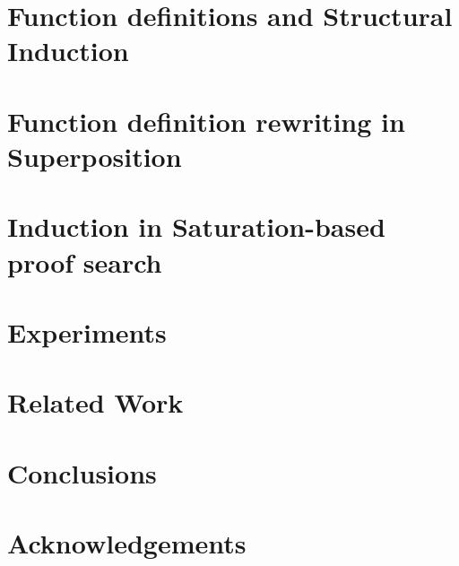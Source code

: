\documentclass[runningheads]{llncs}
\begin{document}
\section{Function definitions and Structural Induction}
\label{sec:fn_defs}


\section{Function definition rewriting in Superposition}
\label{sec:fn_def_rewriting}


\section{Induction in Saturation-based proof search}
\label{sec:saturation}


\section{Experiments}
\label{sec:experiments}


\section{Related Work}


\section{Conclusions}

\section*{Acknowledgements}

%
%
%
% 
% 
%



 
\end{document}

